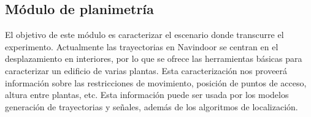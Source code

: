 
\subsection{Módulo de planimetría}

El objetivo de este módulo es caracterizar el escenario donde transcurre el experimento. Actualmente las trayectorias en Navindoor se centran en el desplazamiento en interiores, por lo que se ofrece las herramientas básicas para caracterizar un edificio de varias plantas. Esta caracterización nos proveerá información sobre las restricciones de movimiento, posición de puntos de acceso, altura entre plantas, etc. Esta información puede ser usada por los modelos generación de trayectorias y señales, además de los algoritmos de localización.

